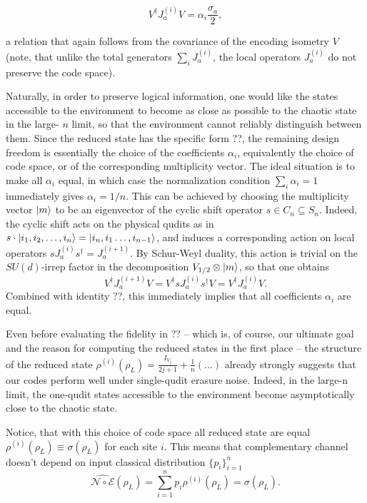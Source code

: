 \documentclass[twocolumn,superscriptaddress,aps,showpacs,amsmath,amstex,amssymb,citeautoscript,floatfix,pra,preprintnumbers]{revtex4-2}
\theoremstyle{plain}
\theoremstyle{plain}
\theoremstyle{plain}
\theoremstyle{plain}
\theoremstyle{plain}
\theoremstyle{plain}
\begin{document}
$$
V^{\dagger} J_a^{(i)} V=\alpha_i \frac{\sigma_a}{2},
$$

a relation that again follows from the covariance of the encoding isometry $V$ (note, that unlike the total generators $\sum_i J_a^{(i)}$, the local operators $J_a^{(i)}$ do not preserve the code space).

Naturally, in order to preserve logical information, one would like the states accessible to the environment to become as close as possible to the chaotic state in the large- $n$ limit, so that the environment cannot reliably distinguish between them. Since the reduced state has the specific form ??, the remaining design freedom is essentially the choice of the coefficients $\alpha_i$, equivalently the choice of code space, or of the corresponding multiplicity vector. The ideal situation is to make all $\alpha_i$ equal, in which case the normalization condition $\sum_i \alpha_i=1$ immediately gives $\alpha_i=1 / n$. This can be achieved by choosing the multiplicity vector $\ket{m}$ to be an eigenvector of the cyclic shift operator $s\in C_n\subseteq S_n$. Indeed, the cyclic shift acts on the physical qudits as in $s\cdot \ket{i_1, i_2, \dots , i_n}=\ket{i_{n}, i_1 \dots , i_{n-1}}$, and induces a corresponding action on local operators $s J_a^{(i)} s^{\dagger}=J_a^{(i+1)}$. By Schur-Weyl duality, this action is trivial on the $SU(d)$-irrep factor in the decomposition $V_{1/2}\otimes \ket{m}$, so that one obtains 
\[
    V^{\dagger} J_a^{(i+1)} V=V^{\dagger} s J_a^{(i)} s^{\dagger} V=V^{\dagger} J_a^{(i)} V.
\]
Combined with identity ??, this immediately implies that all coefficients $\alpha_i$ are equal.

Even before evaluating the fidelity in ?? -- which is, of course, our ultimate goal and the reason for computing the reduced states in the first place -- the structure of the reduced state $\rho^{(i)}(\rho_L)=\frac{I_{V_j}}{2 j+1}+\frac{1}{n}(...)$ already strongly suggests that our codes perform well under single-qudit erasure noise. Indeed, in the large-n limit, the one-qudit states accessible to the environment become asymptotically close to the chaotic state. 

Notice, that with this choice of code space all reduced state are equal $\rho^{(i)}(\rho_L)\equiv \sigma(\rho_L)$ for each site $i$. This means that complementary channel doesn't depend on input classical distribution $\{p_i\}_{i=1}^n$
\[
    \widehat{\mathcal{N}\circ \mathcal{E}}(\rho_L)=\sum_{i=1}^n p_i \rho^{(i)}(\rho_L)=\sigma(\rho_L).
\]
\end{document}
